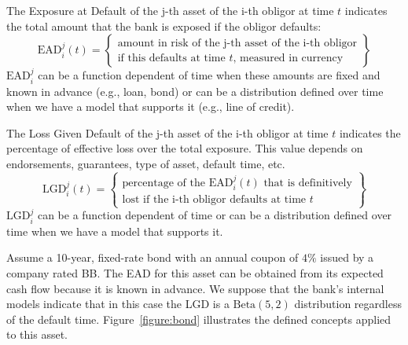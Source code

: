 \documentclass[11pt,fleqn]{book} %
\begin{document}
\begin{definition}
	The Exposure at Default of the j-th asset of the i-th obligor at time $t$
	indicates the total amount that the bank is exposed if the obligor defaults:
	\begin{displaymath}
		\text{EAD}_i^j(t) = \left\{
		\begin{array}{c}
			\text{amount in risk of the j-th asset of the i-th obligor} \\
			\text{if this defaults at time $t$, measured in currency}
		\end{array}
		\right\}
	\end{displaymath}
	$\text{EAD}_i^j$ can be a function dependent of time when these amounts 
	are fixed and known in advance (e.g., loan, bond) or can be a distribution
	defined over time when we have a model that supports it 
	(e.g., line of credit).
\end{definition}

\begin{definition}
	The Loss Given Default of the j-th asset of the i-th obligor at time $t$ 
	indicates the percentage of effective loss over the total exposure. This
	value depends on endorsements, guarantees, type of asset, default time, etc.
	\begin{displaymath}
		\text{LGD}_i^j(t) = \left\{
		\begin{array}{c}
			\text{percentage of the $\text{EAD}_i^j(t)$ that is definitively} \\
			\text{lost if the i-th obligor defaults at time $t$}
		\end{array}
		\right\}
	\end{displaymath}
	$\text{LGD}_i^j$ can be a function dependent of time or can be a 
	distribution defined over time when we have a model that supports it. 
\end{definition}

\begin{example}
	Assume a 10-year, fixed-rate bond with an annual coupon of $4\%$ issued 
	by a company rated BB\@. The EAD for this asset can be obtained from its 
	expected cash flow because it is known in advance. We suppose that the 
	bank's internal models indicate that in this case the LGD is a 
	$\text{Beta}(5,2)$ distribution regardless of the default time.
	Figure~\ref{figure:bond} illustrates the defined concepts applied 
	to this asset.
\end{example}
\end{document}
